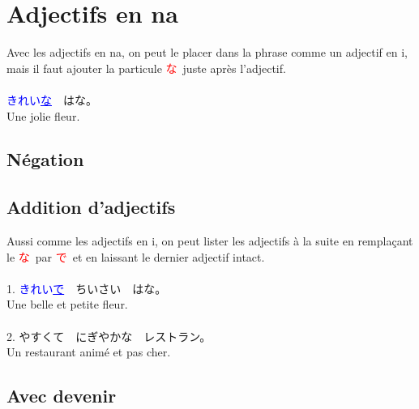 \documentclass[11pt]{report}
\newenvironment{Japanese}{%
\CJKfamily{min}%
\CJKtilde  
\CJKnospace}{}
\begin{document}
\section{Adjectifs en na}

\begin{CJK}{UTF8}{}  
\begin{Japanese}
	Avec les adjectifs en na, on peut le placer dans la phrase comme un adjectif en i, mais il faut ajouter la particule \textcolor{red}{な} \,juste après l'adjectif. \\ \\
	\textcolor{blue}{きれい\underline{な}}　はな。\\
	Une jolie fleur.
\end{Japanese}  
\end{CJK}

\subsection{Négation}

\begin{CJK}{UTF8}{}  
\begin{Japanese}
	
\end{Japanese}  
\end{CJK}

\subsection{Addition d'adjectifs}

\begin{CJK}{UTF8}{}  
\begin{Japanese}
	Aussi comme les adjectifs en i, on peut lister les adjectifs \`a la suite en remplaçant le \textcolor{red}{な} \,par \textcolor{red}{で} \,et en laissant le dernier adjectif intact. \\ \\
	1. \textcolor{blue}{きれい\underline{で}}　ちいさい　はな。 \\
	Une belle et petite fleur. \\ \\
	2. やすくて　にぎやかな　レストラン。 \\
	Un restaurant anim\'e et pas cher.
\end{Japanese}  
\end{CJK}

\subsection{Avec devenir}
\end{document}
